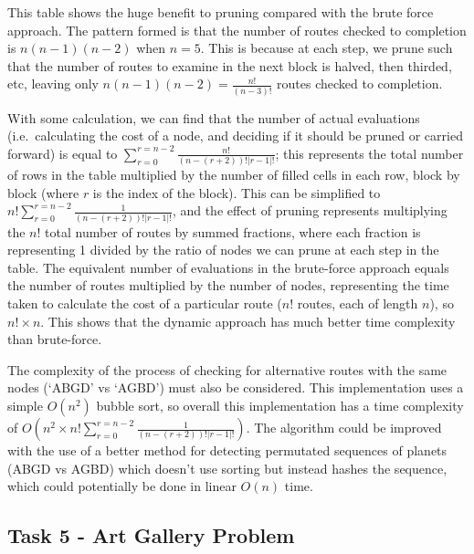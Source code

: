 \documentclass[
]{article}
\begin{document}
This table shows the huge benefit to pruning compared with the brute
force approach. The pattern formed is that the number of routes checked
to completion is \(n(n-1)(n-2)\) when \(n=5\). This is because at each
step, we prune such that the number of routes to examine in the next
block is halved, then thirded, etc, leaving only
\(n(n-1)(n-2)=\frac{n!}{(n-3)!}\) routes checked to completion.

With some calculation, we can find that the number of actual evaluations
(i.e.~calculating the cost of a node, and deciding if it should be
pruned or carried forward) is equal to
\(\sum_{r=0}^{r=n-2} \frac{n!}{(n-(r+2))!|r-1|!}\); this represents the
total number of rows in the table multiplied by the number of filled
cells in each row, block by block (where \(r\) is the index of the
block). This can be simplified to
\(n!\sum_{r=0}^{r=n-2} \frac{1}{(n-(r+2))!|r-1|!}\), and the effect of
pruning represents multiplying the \(n!\) total number of routes by
summed fractions, where each fraction is representing 1 divided by the
ratio of nodes we can prune at each step in the table. The equivalent
number of evaluations in the brute-force approach equals the number of
routes multiplied by the number of nodes, representing the time taken to
calculate the cost of a particular route (\(n!\) routes, each of length
\(n\)), so \(n!\times n\). This shows that the dynamic approach has much
better time complexity than brute-force.

The complexity of the process of checking for alternative routes with
the same nodes (`ABGD' vs `AGBD') must also be considered. This
implementation uses a simple \(O(n^2)\) bubble sort, so overall this
implementation has a time complexity of
\(O(n^2\times n!\sum_{r=0}^{r=n-2} \frac{1}{(n-(r+2))!|r-1|!})\). The
algorithm could be improved with the use of a better method for
detecting permutated sequences of planets (ABGD vs AGBD) which doesn't
use sorting but instead hashes the sequence, which could potentially be
done in linear \(O(n)\) time.

\newpage

\subsection{Task 5 - Art Gallery
Problem}\label{task-5---art-gallery-problem}
\end{document}
